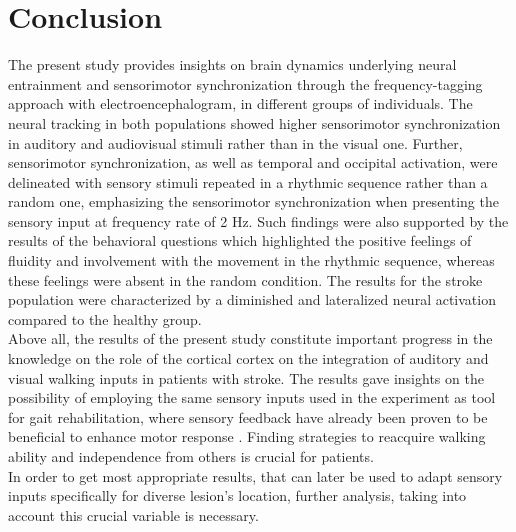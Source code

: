 \chapter{Conclusion}
The present study provides insights on brain dynamics underlying neural entrainment and sensorimotor synchronization through the frequency-tagging approach with electroencephalogram, in different groups of individuals. The neural tracking in both populations showed higher sensorimotor synchronization in auditory and audiovisual stimuli rather than in the visual one. Further, sensorimotor synchronization, as well as temporal and occipital activation, were delineated with sensory stimuli repeated in a rhythmic sequence rather than a random one, emphasizing the sensorimotor synchronization when presenting the sensory input at frequency rate of 2 Hz. Such findings were also supported by the results of the behavioral questions which highlighted the positive feelings of fluidity and involvement with the movement in the rhythmic sequence, whereas these feelings were absent in the random condition. The results for the stroke population were characterized by a diminished and lateralized neural activation compared to the healthy group. \\
Above all, the results of the present study constitute important progress in the knowledge on the role of the cortical cortex on the integration of auditory and visual walking inputs in patients with stroke. The results gave insights on the possibility of employing the same sensory inputs used in the experiment as tool for gait rehabilitation, where sensory feedback have already been proven to be beneficial to enhance motor response \parencite{Bolognini_2016, Gomez_2020}. Finding strategies to reacquire walking ability and independence from others is crucial for patients. \\
In order to get most appropriate results, that can later be used to adapt sensory inputs specifically for diverse lesion's location, further analysis, taking into account this crucial variable is necessary.


